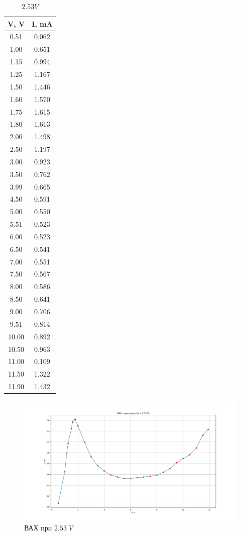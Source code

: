 \documentclass{article}
\begin{document}
\begin{table}[H]
\centering
\begin{tabular}{|c|c|}
\hline
V, V & I, mA     \\\hline
0.51    & 0.062  \\\hline
1.00    & 0.651  \\\hline
1.15    & 0.994  \\\hline
1.25    & 1.167  \\\hline
1.50    & 1.446  \\\hline
1.60    & 1.570  \\\hline
1.75    & 1.615  \\\hline
1.80    & 1.613  \\\hline
2.00    & 1.498  \\\hline
2.50    & 1.197  \\\hline
3.00    & 0.923  \\\hline
3.50    & 0.762  \\\hline
3.99    & 0.665  \\\hline
4.50    & 0.591  \\\hline
5.00    & 0.550  \\\hline
5.51    & 0.523  \\\hline
6.00    & 0.523  \\\hline
6.50    & 0.541  \\\hline
7.00    & 0.551  \\\hline
7.50    & 0.567  \\\hline
8.00    & 0.586  \\\hline
8.50    & 0.641  \\\hline
9.00    & 0.706  \\\hline
9.51    & 0.814  \\\hline
10.00   & 0.892  \\\hline
10.50   & 0.963  \\\hline
11.00   & 0.109  \\\hline
11.50   & 1.322  \\\hline
11.90   & 1.432  \\\hline
\end{tabular}
	\caption{\(2.53V\)}
\end{table}

\begin{figure}[H]
	\centering
	\includegraphics[width=\textwidth]{2.53.png}
	\caption{ВАХ при \(2.53\;V\)}
\end{figure}
\end{document}
